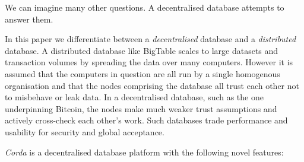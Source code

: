 \documentclass{article}
\begin{document}
We can imagine many other questions. A decentralised database attempts to answer them.

In this paper we differentiate between a \emph{decentralised} database and a \emph{distributed} database. A distributed
database like BigTable\cite{BigTable} scales to large datasets and transaction volumes by spreading the data over many
computers. However it is assumed that the computers in question are all run by a single homogenous organisation and that
the nodes comprising the database all trust each other not to misbehave or leak data. In a decentralised database, such
as the one underpinning Bitcoin\cite{Bitcoin}, the nodes make much weaker trust assumptions and actively cross-check
each other's work. Such databases trade performance and usability for security and global acceptance.

\emph{Corda} is a decentralised database platform with the following novel features:
\end{document}
